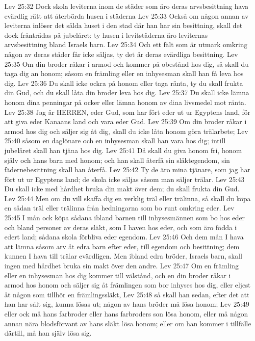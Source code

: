 Lev 25:32  Dock skola leviterna inom de städer som äro deras arvsbesittning hava evärdlig rätt att återbörda husen i städerna
Lev 25:33  Också om någon annan av leviterna inlöser det sålda huset i den stad där han har sin besittning, skall det dock frånträdas på jubelåret; ty husen i levitstäderna äro leviternas arvsbesittning bland Israels barn.
Lev 25:34  Och ett fält som är utmark omkring någon av deras städer får icke säljas, ty det är deras evärdliga besittning.
Lev 25:35  Om din broder råkar i armod och kommer på obestånd hos dig, så skall du taga dig an honom; såsom en främling eller en inhysesman skall han få leva hos dig.
Lev 25:36  Du skall icke ockra på honom eller taga ränta, ty du skall frukta din Gud, och du skall låta din broder leva hos dig.
Lev 25:37  Du skall icke lämna honom dina penningar på ocker eller lämna honom av dina livsmedel mot ränta.
Lev 25:38  Jag är HERREN, eder Gud, som har fört eder ut ur Egyptens land, för att giva eder Kanaans land och vara eder Gud.
Lev 25:39  Om din broder råkar i armod hos dig och säljer sig åt dig, skall du icke låta honom göra trälarbete;
Lev 25:40  såsom en daglönare och en inhysesman skall han vara hos dig; intill jubelåret skall han tjäna hos dig.
Lev 25:41  Då skall du giva honom fri, honom själv och hans barn med honom; och han skall återfå sin släktegendom, sin fädernebesittning skall han återfå.
Lev 25:42  Ty de äro mina tjänare, som jag har fört ut ur Egyptens land; de skola icke säljas såsom man säljer trälar.
Lev 25:43  Du skall icke med hårdhet bruka din makt över dem; du skall frukta din Gud.
Lev 25:44  Men om du vill skaffa dig en verklig träl eller trälinna, så skall du köpa en sådan träl eller trälinna från hedningarna som bo runt omkring eder.
Lev 25:45  I mån ock köpa sådana ibland barnen till inhysesmännen som bo hos eder och bland personer av deras släkt, som I haven hos eder, och som äro födda i edert land; sådana skola förbliva eder egendom.
Lev 25:46  Och dem mån I hava att lämna såsom arv åt edra barn efter eder, till egendom och besittning; dem kunnen I hava till trälar evärdligen. Men ibland edra bröder, Israels barn, skall ingen med hårdhet bruka sin makt över den andre.
Lev 25:47  Om en främling eller en inhysesman hos dig kommer till välstånd, och en din broder råkar i armod hos honom och säljer sig åt främlingen som bor inhyses hos dig, eller eljest åt någon som tillhör en främlingssläkt,
Lev 25:48  så skall han sedan, efter det att han har sålt sig, kunna lösas ut; någon av hans bröder må lösa honom;
Lev 25:49  eller ock må hans farbroder eller hans farbroders son lösa honom, eller må någon annan nära blodsförvant av hans släkt lösa honom; eller om han kommer i tillfälle därtill, må han själv lösa sig.
